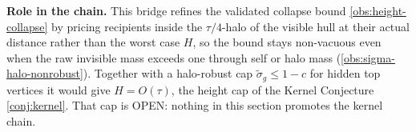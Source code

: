 \noindent\textbf{Role in the chain.} This bridge refines the validated
collapse bound \ref{obs:height-collapse} by pricing recipients inside
the $\tau/4$-halo of the visible hull at their actual distance rather
than the worst case $H$, so the bound stays non-vacuous even when the
raw invisible mass exceeds one through self or halo mass
(\ref{obs:sigma-halo-nonrobust}).  Together with a halo-robust cap
$\tilde\sigma_g \le 1-c$ for hidden top vertices it would give
$H = O(\tau)$, the height cap of the Kernel Conjecture
\ref{conj:kernel}.  That cap is OPEN: nothing in this section promotes
the kernel chain.
